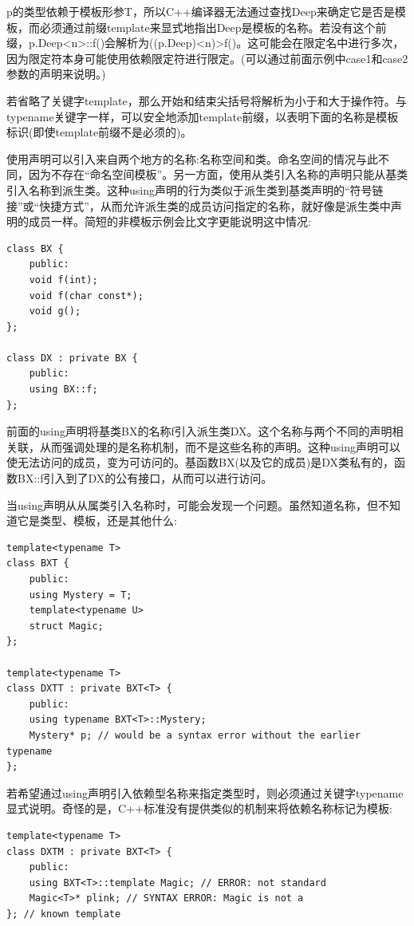 p的类型依赖于模板形参T，所以C++编译器无法通过查找Deep来确定它是否是模板，而必须通过前缀template来显式地指出Deep是模板的名称。若没有这个前缀，p.Deep<n>::f()会解析为((p.Deep)<n)>f()。这可能会在限定名中进行多次，因为限定符本身可能使用依赖限定符进行限定。(可以通过前面示例中case1和case2参数的声明来说明。)

若省略了关键字template，那么开始和结束尖括号将解析为小于和大于操作符。与typename关键字一样，可以安全地添加template前缀，以表明下面的名称是模板标识(即使template前缀不是必须的)。


使用声明可以引入来自两个地方的名称:名称空间和类。命名空间的情况与此不同，因为不存在“命名空间模板”。另一方面，使用从类引入名称的声明只能从基类引入名称到派生类。这种using声明的行为类似于派生类到基类声明的“符号链接”或“快捷方式”，从而允许派生类的成员访问指定的名称，就好像是派生类中声明的成员一样。简短的非模板示例会比文字更能说明这中情况:

\begin{lstlisting}[style=styleCXX]
class BX {
	public:
	void f(int);
	void f(char const*);
	void g();
};

class DX : private BX {
	public:
	using BX::f;
};
\end{lstlisting}

前面的using声明将基类BX的名称f引入派生类DX。这个名称与两个不同的声明相关联，从而强调处理的是名称机制，而不是这些名称的声明。这种using声明可以使无法访问的成员，变为可访问的。基函数BX(以及它的成员)是DX类私有的，函数BX::f引入到了DX的公有接口，从而可以进行访问。

当using声明从从属类引入名称时，可能会发现一个问题。虽然知道名称，但不知道它是类型、模板，还是其他什么:

\begin{lstlisting}[style=styleCXX]
template<typename T>
class BXT {
	public:
	using Mystery = T;
	template<typename U>
	struct Magic;
};

template<typename T>
class DXTT : private BXT<T> {
	public:
	using typename BXT<T>::Mystery;
	Mystery* p; // would be a syntax error without the earlier typename
};
\end{lstlisting}

若希望通过using声明引入依赖型名称来指定类型时，则必须通过关键字typename显式说明。奇怪的是，C++标准没有提供类似的机制来将依赖名称标记为模板:

\begin{lstlisting}[style=styleCXX]
template<typename T>
class DXTM : private BXT<T> {
	public:
	using BXT<T>::template Magic; // ERROR: not standard
	Magic<T>* plink; // SYNTAX ERROR: Magic is not a
}; // known template
\end{lstlisting}

